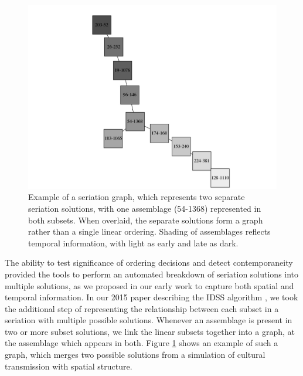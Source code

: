     \begin{figure}[ht]
    \centering
    \includegraphics[scale=0.40]{graphics/multipleseriation/example-graph-branching-seriation.pdf}
    \caption{Example of a seriation graph, which represents two separate seriation solutions, with one assemblage (54-1368) represented in both subsets.  When overlaid, the separate solutions form a graph rather than a single linear ordering.  Shading of assemblages reflects temporal information, with light as early and late as dark.}
    \label{metapop:fig:seriation-graph-example}
    \end{figure}
    
    The ability to test significance of ordering decisions and detect contemporaneity provided the tools to perform an automated breakdown of seriation solutions into multiple solutions, as we proposed in our early work to capture both spatial and temporal information.  In our 2015 paper describing the IDSS algorithm \citep{Lipo2015}, we took the additional step of representing the relationship between each subset in a seriation with multiple possible solutions.  Whenever an assemblage is present in two or more subset solutions, we link the linear subsets together into a graph, at the assemblage which appears in both.  Figure \ref{metapop:fig:seriation-graph-example} shows an example of such a graph, which merges two possible solutions from a simulation of cultural transmission with spatial structure.  
    

